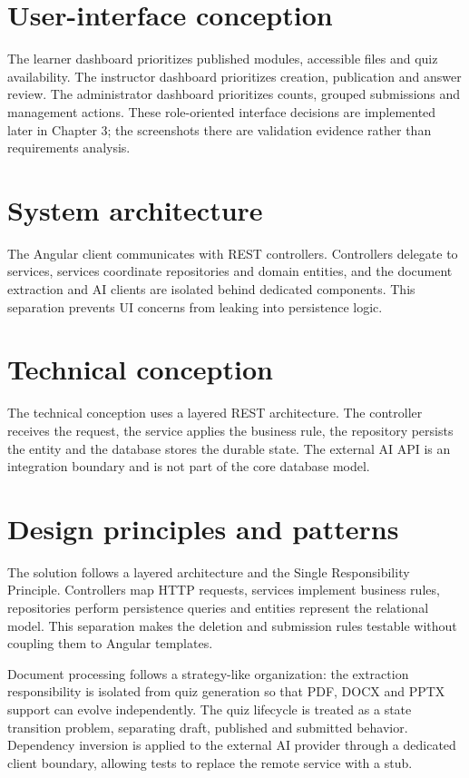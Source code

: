 \section{User-interface conception}
The learner dashboard prioritizes published modules, accessible files and quiz
availability. The instructor dashboard prioritizes creation, publication and
answer review. The administrator dashboard prioritizes counts, grouped
submissions and management actions. These role-oriented interface decisions
are implemented later in Chapter 3; the screenshots there are validation
evidence rather than requirements analysis.

\section{System architecture}
The Angular client communicates with REST controllers. Controllers delegate to
services, services coordinate repositories and domain entities, and the
document extraction and AI clients are isolated behind dedicated components.
This separation prevents UI concerns from leaking into persistence logic.

\section{Technical conception}
The technical conception uses a layered REST architecture. The controller
receives the request, the service applies the business rule, the repository
persists the entity and the database stores the durable state. The external AI
API is an integration boundary and is not part of the core database model.

\section{Design principles and patterns}
The solution follows a layered architecture and the Single Responsibility
Principle. Controllers map HTTP requests, services implement business rules,
repositories perform persistence queries and entities represent the relational
model. This separation makes the deletion and submission rules testable
without coupling them to Angular templates.

Document processing follows a strategy-like organization: the extraction
responsibility is isolated from quiz generation so that PDF, DOCX and PPTX
support can evolve independently. The quiz lifecycle is treated as a state
transition problem, separating draft, published and submitted behavior.
Dependency inversion is applied to the external AI provider through a
dedicated client boundary, allowing tests to replace the remote service with a
stub.

